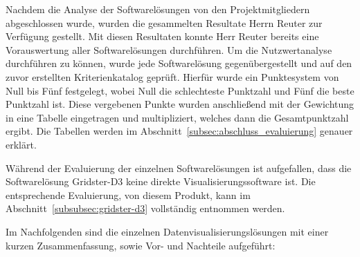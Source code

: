 Nachdem die Analyse der Softwarelösungen von den Projektmitgliedern
abgeschlossen wurde, wurden die gesammelten Resultate Herrn Reuter zur
Verfügung gestellt. Mit diesen Resultaten konnte Herr Reuter bereits eine
Vorauswertung aller Softwarelösungen durchführen. Um die Nutzwertanalyse
durchführen zu können, wurde jede Softwarelösung gegenübergestellt und auf den
zuvor erstellten Kriterienkatalog geprüft. Hierfür wurde ein Punktesystem von
Null bis Fünf festgelegt, wobei Null die schlechteste Punktzahl und Fünf die
beste Punktzahl ist. Diese vergebenen Punkte wurden anschließend mit der
Gewichtung in eine Tabelle eingetragen und multipliziert, welches dann die
Gesamtpunktzahl ergibt. Die Tabellen werden im
Abschnitt~\ref{subsec:abschluss_evaluierung} genauer erklärt.

Während der Evaluierung der einzelnen Softwarelösungen ist aufgefallen, dass
die Softwarelösung Gridster\hyp{}D3 keine direkte Visualisierungssoftware ist.
Die entsprechende Evaluierung, von diesem Produkt, kann im
Abschnitt~\ref{subsubsec:gridster-d3} vollständig entnommen werden.

Im Nachfolgenden sind die einzelnen Datenvisualisierungslösungen mit einer
kurzen Zusammenfassung, sowie Vor\hyp{} und Nachteile aufgeführt:
\mr%

